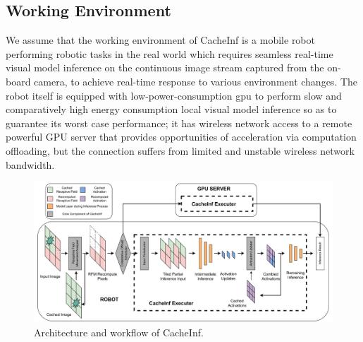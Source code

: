 
\subsection{Working Environment}
We assume that the working environment of CacheInf is a mobile robot performing robotic tasks in the real world which requires seamless real-time visual model inference on the continuous image stream captured from the on-board camera, to achieve real-time response to various environment changes.
The robot itself is equipped with low-power-consumption gpu to perform slow and comparatively high energy consumption local visual model inference so as to guarantee its worst case performance; it has wireless network access to a remote powerful GPU server that provides opportunities of acceleration via computation offloading, but the connection suffers from limited and unstable wireless network bandwidth.


\begin{figure}[!htb]
    \centering
    \includegraphics[width=\linewidth]{fig/overview_new_new.drawio.pdf}
    \caption[track]{Architecture and workflow of CacheInf.}
    \label{fig:overview}
\end{figure}


